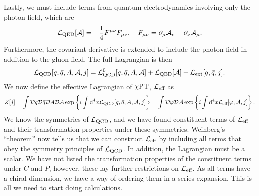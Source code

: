 Lastly, we must include terms from quantum electrodynamics involving only the photon field, which are
%
\begin{equation}
    \mathcal{L}_\text{QED}[\mathcal A] 
    = -\frac{1}{4} F^{\mu \nu}F_{\mu \nu}, \quad
    F_{\mu \nu} = \partial_{\mu}\mathcal A_{\nu} - \partial_{\nu}\mathcal A_{\mu}.
\end{equation}
%
Furthermore, the covariant derivative is extended to include the photon field in addition to the gluon field.
The full Lagrangian is then
%
\begin{equation}
    \mathcal{L}_\text{QCD}[q, \bar q, A,\mathcal A, j] 
    = \mathcal{L}_\text{QCD}^0[q, \bar q, A, \mathcal A] 
    + \mathcal{L}_\text{QED}[\mathcal A] + \mathcal{L}_\text{ext}[q, \bar q, j].
\end{equation}
%
We now define the effective Lagrangian of $\chi \text{PT}$, $\mathcal{L}_\text{eff}$ as
%
\begin{equation}
    \label{definition effective Lagrangian chpt}
    Z[j]
    = 
    \int \mathcal D q \mathcal D \bar q \mathcal D A \mathcal D \mathcal A\,
    \text{exp} \left\{ i\int \text{d}^4 x \mathcal{L}_\text{QCD}[q, \bar q, A, \mathcal A, j]  \right\}
    = 
    \int \mathcal D \varphi \mathcal D \mathcal A\,
    \text{exp} \left\{ i\int \text{d}^4 x \mathcal{L}_\text{eff}[\varphi, \mathcal{A}, j]  \right\}.
\end{equation}
%
We know the symmetries of $\mathcal{L}_\text{QCD}$, and we have found constituent terms of $\mathcal{L}_\text{eff}$ and their transformation properties under these symmetries.
Weinberg's ``theorem'' now tells us that we can construct $\mathcal{L}_\text{eff}$ by including all terms that obey the symmetry principles of $\mathcal{L}_\text{QCD}$.
In addition, the Lagrangian must be a scalar.
We have not listed the transformation properties of the constituent terms under $C$ and $P$, however, these lay further restrictions on $\mathcal{L}_\text{eff}$.
As all terms have a chiral dimension, we have a way of ordering them in a series expansion.
This is all we need to start doing calculations.

